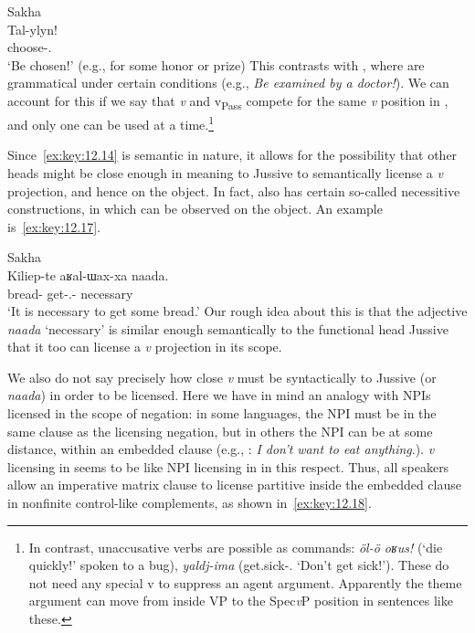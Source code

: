 \documentclass[output=paper]{langsci/langscibook}
\begin{document}
\ea\label{ex:key:12.16}Sakha\\
    \gll \llap{*}Tal-ylyn!\\
		choose-\Pass{}.\Imp{}\\
    \glt ‘Be chosen!’ (e.g., for some honor or prize)
\z
This contrasts with , where   are grammatical
under certain conditions (e.g., \emph{Be examined by a doctor!}). We can
account for this if we say that \emph{v}\textsubscript{\Imp} and
v\textsubscript{Pass} compete for the same \emph{v} position in ,
and only one can be used at a time.\footnote{In contrast,
    unaccusative verbs are possible as commands: \emph{öl-ö
    oʁus!} (‘die quickly!’ spoken to a bug), \emph{yaldj-ima}
    (get.sick-\Neg.\Imp{} ‘Don’t get sick!’). These do not need any special v
to suppress an agent argument. Apparently the theme argument can move from
inside VP to the Spec\emph{v}\textsubscript{\Imp}P position in sentences like
these.}

Since~\eqref{ex:key:12.14} is semantic in nature, it allows for the possibility
that other heads might be close enough in meaning to Jussive to semantically
license a \emph{v}\textsubscript{\Imp} projection, and hence  on the object. In fact,  also has certain so-called
necessitive constructions, in which  can be observed on the
object. An example is~\eqref{ex:key:12.17}.

\ea\label{ex:key:12.17}Sakha\\
    \gll Kiliep-te  aʁal-ɯax-xa  naada.\\
    bread-\Part{}  get-\Pros{}.\Ptcp{}-\Dat{}  necessary\\
    \glt ‘It is necessary to get some bread.’ \parencite[429]{StachowskiMenz1998}
\z
Our rough idea about this is that the adjective \emph{naada} ‘necessary’ is
similar enough semantically to the functional head Jussive that it too can
license a \emph{v}\textsubscript{\Imp} projection in its scope.

We also do not say precisely how close \emph{v}\textsubscript{\Imp} must be
syntactically to Jussive (or \emph{naada}) in order to be licensed. Here we
have in mind an analogy with \glspl{NPI} licensed in the scope of negation: in
some languages, the \gls{NPI} must be in the same clause as the licensing
negation, but in others the \gls{NPI} can be at some distance, within an
embedded clause (e.g., : \emph{I don’t} \emph{want to eat
anything}.).  \emph{v}\textsubscript{\Imp} licensing in  seems to be
like NPI licensing in  in this respect. Thus, all speakers allow
an imperative matrix clause to license partitive inside the embedded clause in
nonfinite control-like complements, as shown in~\eqref{ex:key:12.18}.\newpage
\end{document}
